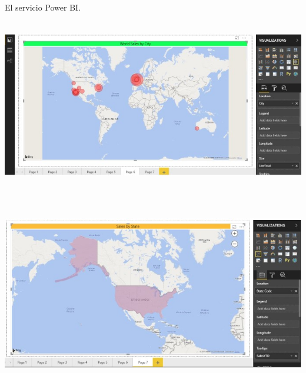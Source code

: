 \documentclass[12pt,letterpaper]{article}
\begin{document}
\begin{flushleft}
\begin{itemize}
El servicio Power BI.\\
\textbf{ }\\
\begin{center}
	\includegraphics[width=15cm]{./Imagenes/image39} 
	\end{center}
\textbf{ }\\
\textbf{ }\\
\begin{center}
	\includegraphics[width=15cm]{./Imagenes/image40} 
	\end{center}
\textbf{ }\\


\end{itemize} 


\end{flushleft}
\end{document}
